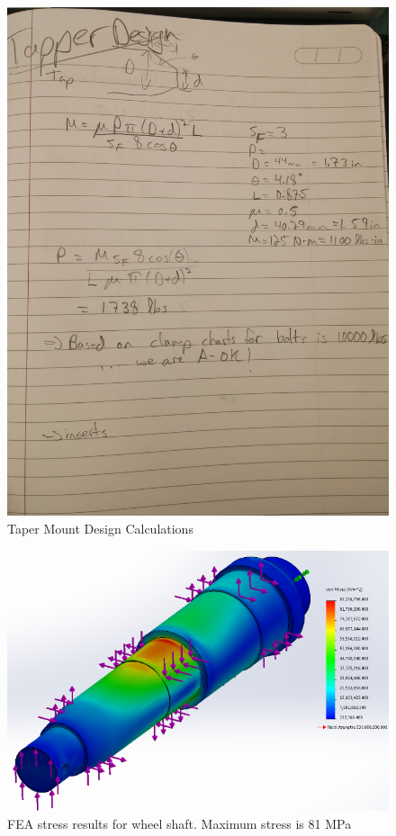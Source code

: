 \begin{figure}[H]
	\centering
	\includegraphics[width=\textwidth]{dom/taper_design_calc.jpg}
	\caption{Taper Mount Design Calculations}
	\label{fig:taper_calc}
\end{figure}

\begin{figure}[H]
\centering
\includegraphics[width=\textwidth]{images/wheel_shaft_fea}
\caption[Wheel Shaft FEA Stress Results]{FEA stress results for wheel shaft. Maximum stress is 81 MPa}
\label{fig:wheel_shaft_stress_fea}
\end{figure}

